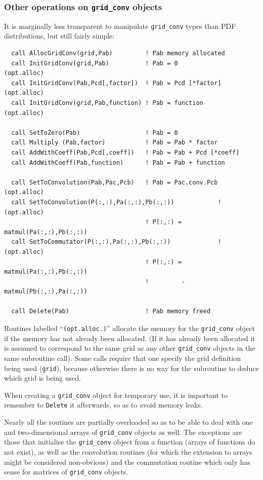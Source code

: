 \documentclass[12pt]{article}
\begin{document}
\subsubsection{Other operations on \texttt{grid\_conv} objects}
\label{sec:other_grid_conv_ops}
%
It is marginally less transparent to manipulate \texttt{grid\_conv} types
than PDF distributions, but still fairly simple:
\begin{verbatim}
  call AllocGridConv(grid,Pab)         ! Pab memory allocated 
  call InitGridConv(grid,Pab)          ! Pab = 0             (opt.alloc)
  call InitGridConv(Pab,Pcd[,factor])  ! Pab = Pcd [*factor] (opt.alloc)
  call InitGridConv(grid,Pab,function) ! Pab = function      (opt.alloc)

  call SetToZero(Pab)                  ! Pab = 0
  call Multiply (Pab,factor)           ! Pab = Pab * factor
  call AddWithCoeff(Pab,Pcd[,coeff])   ! Pab = Pab + Pcd [*coeff]
  call AddWithCoeff(Pab,function)      ! Pab = Pab + function

  call SetToConvolution(Pab,Pac,Pcb)   ! Pab = Pac.conv.Pcb  (opt.alloc)
  call SetToConvolution(P(:,:),Pa(:,:),Pb(:,:))            ! (opt.alloc)
                                       ! P(:,:) = matmul(Pa(:,:),Pb(:,:))
  call SetToCommutator(P(:,:),Pa(:,:),Pb(:,:))             ! (opt.alloc)
                                       ! P(:,:) = matmul(Pa(:,:),Pb(:,:))
                                       !         -matmul(Pb(:,:),Pa(:,:))    

  call Delete(Pab)                     ! Pab memory freed
\end{verbatim}
Routines labelled ``\texttt{(opt.alloc.)}'' allocate the memory for
the \texttt{grid\_conv} object if the memory has not already been
allocated. (If it has already been allocated it is assumed to
correspond to the same grid as any other \texttt{grid\_conv} objects
in the same subroutine call). Some calls require that one specify the
grid definition being used (\texttt{grid}), because otherwise there is
no way for the subroutine to deduce which grid is being used.

When creating a \texttt{grid\_conv} object for temporary use, it is
important to remember to \texttt{Delete} it afterwards, so as to avoid
memory leaks.

Nearly all the routines are partially overloaded so as to be able to
deal with one and two-dimensional arrays of \texttt{grid\_conv}
objects as well. The exceptions are those that initialise the
\texttt{grid\_conv} object from a function (arrays of functions do not
exist), as well as the convolution routines (for which the extension
to arrays might be considered non-obvious) and the commutation routine
which only has sense for matrices of \texttt{grid\_conv} objects.
\end{document}
